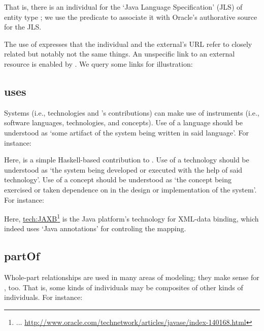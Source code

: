 \noindent
That is, there is an \solasote{} individual for the `Java Language
Specification' (JLS) of entity type ; we use the
 predicate to associate it with Oracle's authorative
source for the JLS.

The use of  expresses that the \solasote{}
individual and the external's URL refer to closely related but notably
not the same things. An unspecific link to an external resource is
enabled by . We query some links for illustration:




\subsection{uses} 

Systems (i.e., technologies and \ooo{}'s contributions) can make use
of instruments (i.e., software languages, technologies, and
concepts). Use of a language should be understood as `some artifact of
the system being written in said language'. For instance:


\noindent
Here,  is a simple Haskell-based contribution
to \ooo{}. Use of a technology should be understood as `the system
being developed or executed with the help of said technology'. Use of
a concept should be understood as `the concept being exercised or
taken dependence on in the design or implementation of the
system'. For instance:


\noindent
Here, \url{tech:JAXB}\footnote{... 
  \url{http://www.oracle.com/technetwork/articles/javase/index-140168.html}}
is the Java platform's technology for XML-data binding, which indeed
uses `Java annotations' for controling the mapping.


\subsection{partOf}

Whole-part relationships are used in many areas of modeling; they make
sense for \solasote, too. That is, some kinds of \solasote{}
individuals may be composites of other kinds of \solasote{}
individuals. For instance:

